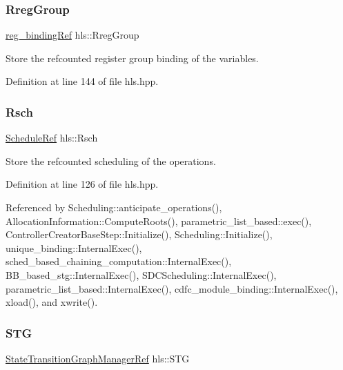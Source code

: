 \mbox{\label{classhls_a4b08c33d2bcb4c34a0fcdd77b0d94a49}} 
\subsubsection{\texorpdfstring{Rreg\+Group}{RregGroup}}
{\footnotesize\ttfamily \hyperlink{reg__binding_8hpp_aa41bd7902f9f054af782503a16789fd2}{reg\+\_\+binding\+Ref} hls\+::\+Rreg\+Group}



Store the refcounted register group binding of the variables. 



Definition at line 144 of file hls.\+hpp.

\mbox{\label{classhls_ac03911288ca9f62135c2d74f01d49b4b}} 
\subsubsection{\texorpdfstring{Rsch}{Rsch}}
{\footnotesize\ttfamily \hyperlink{schedule_8hpp_af67f402958b3b52a1ec5cc4ce08ae3b9}{Schedule\+Ref} hls\+::\+Rsch}



Store the refcounted scheduling of the operations. 



Definition at line 126 of file hls.\+hpp.



Referenced by Scheduling\+::anticipate\+\_\+operations(), Allocation\+Information\+::\+Compute\+Roots(), parametric\+\_\+list\+\_\+based\+::exec(), Controller\+Creator\+Base\+Step\+::\+Initialize(), Scheduling\+::\+Initialize(), unique\+\_\+binding\+::\+Internal\+Exec(), sched\+\_\+based\+\_\+chaining\+\_\+computation\+::\+Internal\+Exec(), B\+B\+\_\+based\+\_\+stg\+::\+Internal\+Exec(), S\+D\+C\+Scheduling\+::\+Internal\+Exec(), parametric\+\_\+list\+\_\+based\+::\+Internal\+Exec(), cdfc\+\_\+module\+\_\+binding\+::\+Internal\+Exec(), xload(), and xwrite().

\mbox{\label{classhls_a7dfd09bac28f7aa9cfdda5b539e4c0c7}} 
\subsubsection{\texorpdfstring{S\+TG}{STG}}
{\footnotesize\ttfamily \hyperlink{state__transition__graph__manager_8hpp_af0c5e63a678c09ef63a87b9cbe427978}{State\+Transition\+Graph\+Manager\+Ref} hls\+::\+S\+TG}



